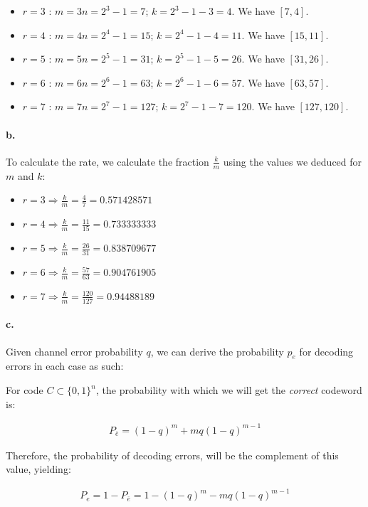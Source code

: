 \documentclass{article}
\begin{document}
\begin{itemize}
  \item \textbf{$r=3$} : $m=3n=2^3-1=7$; $k=2^3-1-3=4$. We have $[7,4]$.
  \item \textbf{$r=4$} : $m=4n=2^4-1=15$; $k=2^4-1-4=11$. We have $[15,11]$.
  \item \textbf{$r=5$} : $m=5n=2^5-1=31$; $k=2^5-1-5=26$. We have $[31,26]$.
  \item \textbf{$r=6$} : $m=6n=2^6-1=63$; $k=2^6-1-6=57$. We have $[63,57]$.
  \item \textbf{$r=7$} : $m=7n=2^7-1=127$; $k=2^7-1-7=120$. We have $[127,120]$.
\end{itemize}

\paragraph{b.} To calculate the rate, we calculate the fraction $\frac{k}{m}$
using the values we deduced for $m$ and $k$:

\begin{itemize}
  \item $r=3 \Rightarrow \frac{k}{m}=\frac{4}{7}=0.571428571$
  \item $r=4 \Rightarrow \frac{k}{m}=\frac{11}{15}=0.733333333$
  \item $r=5 \Rightarrow \frac{k}{m}=\frac{26}{31}=0.838709677$
  \item $r=6 \Rightarrow \frac{k}{m}=\frac{57}{63}=0.904761905$
  \item $r=7 \Rightarrow \frac{k}{m}=\frac{120}{127}=0.94488189$
\end{itemize}

\paragraph{c.} Given channel error probability $q$, we can derive the probability
$p_e$ for decoding errors in each case as such:

For code $C \subset \{0,1\}^n$, the probability with which we will get the \textit{correct}
codeword is:

\begin{align*}
  P_{\overline{e}}=(1-q)^m+mq(1-q)^{m-1}
\end{align*}

Therefore, the probability of decoding errors, will be the complement of this value,
yielding:

\begin{align*}
  P_e=1-P_{\overline{e}}=1-(1-q)^m-mq(1-q)^{m-1}
\end{align*}
\end{document}
